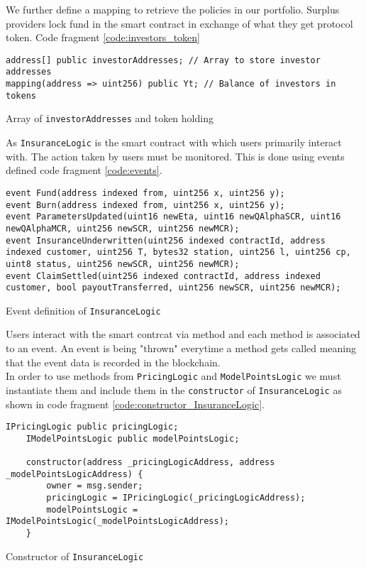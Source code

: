 \documentclass[10pt]{article}
\begin{document}
We further define a mapping to retrieve the policies in our portfolio. Surplus providers lock fund in the smart contract in exchange of what they get protocol token. Code fragment \ref{code:investors_token}

\begin{codefragment}[!h]
\begin{lstlisting}[language=Solidity]
address[] public investorAddresses; // Array to store investor addresses
mapping(address => uint256) public Yt; // Balance of investors in tokens

\end{lstlisting}
    \caption{Array of \texttt{investorAddresses} and token holding}
    \label{code:investors_token}
\end{codefragment}

As \texttt{InsuranceLogic} is the smart contract with which users primarily interact with. The action taken by users must be monitored. This is done using events defined code fragment \ref{code:events}.

\begin{codefragment}[!h]
\begin{lstlisting}[language=Solidity]
event Fund(address indexed from, uint256 x, uint256 y);
event Burn(address indexed from, uint256 x, uint256 y);
event ParametersUpdated(uint16 newEta, uint16 newQAlphaSCR, uint16 newQAlphaMCR, uint256 newSCR, uint256 newMCR);
event InsuranceUnderwritten(uint256 indexed contractId, address indexed customer, uint256 T, bytes32 station, uint256 l, uint256 cp, uint8 status, uint256 newSCR, uint256 newMCR); 
event ClaimSettled(uint256 indexed contractId, address indexed customer, bool payoutTransferred, uint256 newSCR, uint256 newMCR);
\end{lstlisting}
    \caption{Event definition of \texttt{InsuranceLogic}}
    \label{code:events}
\end{codefragment}

Users interact with the smart contrcat via method and each method is associated to an event. An event is being "thrown" everytime a method gets called meaning that the event data is recorded in the blockchain.\\ 

In order to use methods from \texttt{PricingLogic} and \texttt{ModelPointsLogic} we must instantiate them and include them in the \texttt{constructor} of \texttt{InsuranceLogic} as shown in code fragment \ref{code:constructor_InsuranceLogic}.

\begin{codefragment}[!h]
\begin{lstlisting}[language=Solidity]
IPricingLogic public pricingLogic;
    IModelPointsLogic public modelPointsLogic;

    constructor(address _pricingLogicAddress, address _modelPointsLogicAddress) {
        owner = msg.sender;
        pricingLogic = IPricingLogic(_pricingLogicAddress);
        modelPointsLogic = IModelPointsLogic(_modelPointsLogicAddress);
    }

    \end{lstlisting}
    \caption{Constructor of \texttt{InsuranceLogic}}
    \label{code:constructor_InsuranceLogic}
\end{codefragment}
\end{document}
